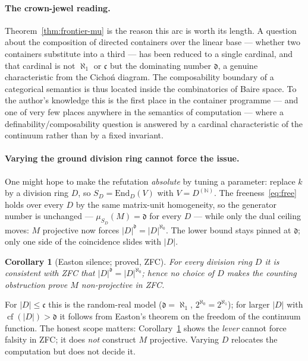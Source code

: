 \documentclass[11pt]{report}
\theoremstyle{plain}
\newtheorem{corollary}[theorem]{Corollary}
\theoremstyle{definition}
\theoremstyle{remark}
\newcommand{\dd}{\mathfrak{d}}
\newcommand{\cont}{\mathfrak{c}}
\newcommand{\End}{\mathrm{End}}
\newcommand{\N}{\mathbb{N}}
\DeclareMathOperator{\cf}{cf}
\begin{document}
\paragraph{The crown-jewel reading.}
Theorem~\ref{thm:frontier-mu} is the reason this arc is worth its length. A
question about the composition of directed containers over the linear base ---
whether two containers substitute into a third --- has been reduced to a single
cardinal, and that cardinal is not $\aleph_1$ or $\cont$ but the dominating
number $\dd$, a genuine characteristic from the Cicho\'n diagram. The
composability boundary of a categorical semantics is thus located inside the
combinatorics of Baire space. To the author's knowledge this is the first place
in the container programme --- and one of very few places anywhere in the
semantics of computation --- where a definability/composability question is
answered by a cardinal characteristic of the continuum rather than by a fixed
invariant.

\paragraph{Varying the ground division ring cannot force the issue.}
One might hope to make the refutation \emph{absolute} by tuning a parameter:
replace $k$ by a division ring $D$, so $S_D=\End_D(V)$ with
$V=D^{(\N)}$. The freeness~\eqref{eq:free} holds over every $D$ by the same
matrix-unit homogeneity, so the generator number is unchanged --- $\mu_{S_D}(M)=\dd$
for every $D$ --- while only the dual ceiling moves: $M$ projective now forces
$|D|^{\dd}=|D|^{\aleph_0}$. The lower bound stays pinned at $\dd$; only one side
of the coincidence slides with $|D|$.

\begin{corollary}[Easton silence; proved, ZFC]\label{cor:frontier-easton}
For every division ring $D$ it is consistent with ZFC that
$|D|^{\dd}=|D|^{\aleph_0}$; hence no choice of $D$ makes the counting obstruction
prove $M$ non-projective in ZFC.
\end{corollary}

For $|D|\le\cont$ this is the random-real model ($\dd=\aleph_1$,
$2^{\aleph_0}=2^{\aleph_1}$); for larger $|D|$ with $\cf(|D|)>\dd$ it follows
from Easton's theorem on the freedom of the continuum function. The honest scope
matters: Corollary~\ref{cor:frontier-easton} shows the \emph{lever} cannot force
falsity in ZFC; it does \emph{not} construct $M$ projective. Varying $D$
relocates the computation but does not decide it.
\end{document}
